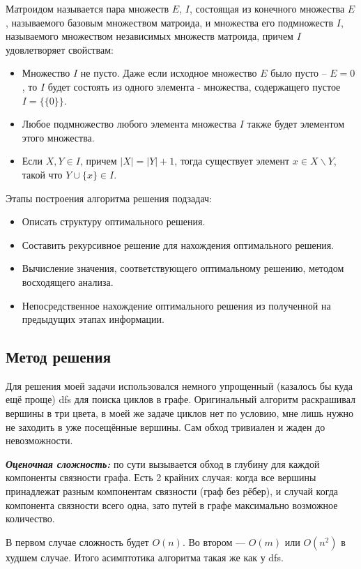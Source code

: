 \documentclass[12pt]{article}
\begin{document}
Матроидом называется пара множеств $E$, $I$, состоящая из конечного множества $E$, называемого
базовым множеством матроида, и множества его подмножеств $I$, называемого множеством
независимых множеств матроида, причем $I$ удовлетворяет свойствам:
\begin{itemize}
	\item Множество $I$ не пусто. Даже если исходное множество $E$ было пусто -- $E = 0$, то $I$ будет состоять из одного элемента - множества, содержащего пустое $I = \{\{0\}\}$.
	\item Любое подмножество любого элемента множества $I$ также будет элементом этого
	      множества.
	\item Если $X, Y \in I$, причем $|X| = |Y| + 1$, тогда существует элемент
	      $x \in X\backslash Y$, такой что $Y \cup \{x\} \in I$.
\end{itemize}

\noindent Этапы построения алгоритма решения подзадач:
\begin{itemize}
	\item Описать структуру оптимального решения.
	\item Составить рекурсивное решение для нахождения оптимального решения.
	\item Вычисление значения, соответствующего оптимальному решению, методом
	      восходящего анализа.
	\item Непосредственное нахождение оптимального решения из полученной на предыдущих
	      этапах информации.
\end{itemize}

\subsection*{Метод решения}

Для решения моей задачи использовался немного упрощенный (казалось бы куда ещё проще) dfs для поиска циклов в графе. Оригинальный алгоритм раскрашивал вершины в три цвета, в моей же задаче циклов нет по условию, мне лишь нужно не заходить в уже посещённые вершины. Сам обход тривиален и жаден до невозможности.

\textbf{ \textit{Оценочная сложность:}} по сути вызывается обход в глубину для каждой компоненты связности графа. Есть 2 крайних случая: когда все вершины принадлежат разным компонентам связности (граф без рёбер), и случай когда компонента связности всего одна, зато путей в графе максимально возможное количество.

В первом случае сложность будет $O(n)$. Во втором --- $O(m)$ или $O(n^2)$ в худшем случае. Итого асимптотика алгоритма такая же как у dfs.
\end{document}
